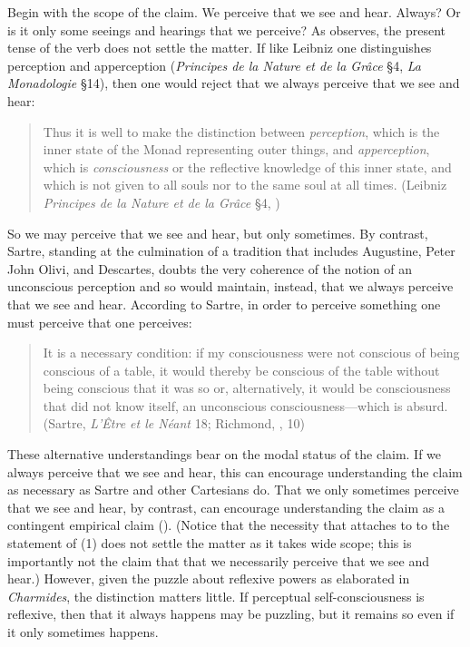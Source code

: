 Begin with the scope of the claim. We perceive that we see and hear. Always? Or is it only some seeings and hearings that we perceive? As \citet[]{McCabe:2007jb} observes, the present tense of the verb does not settle the matter. If like Leibniz one distinguishes perception and apperception (\emph{Principes de la Nature et de la Grâce} §4, \emph{La Monadologie} §14), then one would reject that we always perceive that we see and hear:
\begin{quote}
	Thus it is well to make the distinction between \emph{perception}, which is the inner state of the Monad representing outer things, and \emph{apperception}, which is \emph{consciousness} or the reflective knowledge of this inner state, and which is not given to all souls nor to the same soul at all times. (Leibniz \emph{Principes de la Nature et de la Grâce} §4, \citealt[411]{Latta:1898aa})
\end{quote}
So we may perceive that we see and hear, but only sometimes. By contrast, Sartre, standing at the culmination of a tradition that includes Augustine, Peter John Olivi, and Descartes, doubts the very coherence of the notion of an unconscious perception and so would maintain, instead, that we always perceive that we see and hear. According to Sartre, in order to perceive something one must perceive that one perceives: 
\begin{quote}
	It is a necessary condition: if my consciousness were not conscious of being conscious of a table, it would thereby be conscious of the table without being conscious that it was so or, alternatively, it would be consciousness that did not know itself, an unconscious consciousness—which is absurd. (Sartre, \emph{L'Être et le Néant} 18; Richmond, \citeyear{Sartre:2018aa}, 10)
\end{quote}
These alternative understandings bear on the modal status of the claim. If we always perceive that we see and hear, this can encourage understanding the claim as necessary as Sartre and other Cartesians do. That we only sometimes perceive that we see and hear, by contrast, can encourage understanding the claim as a contingent empirical claim (\citealt[401]{Osborne:1983le}). (Notice that the necessity that attaches to to the statement of (1) does not settle the matter as it takes wide scope; this is importantly not the claim that that we necessarily perceive that we see and hear.) However, given the puzzle about reflexive powers as elaborated in \emph{Charmides}, the distinction matters little. If perceptual self-consciousness is reflexive, then that it always happens may be puzzling, but it remains so even if it only sometimes happens.

